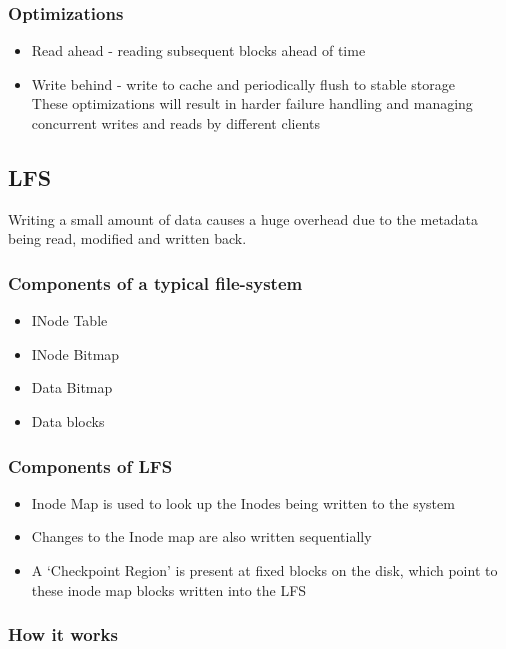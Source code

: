 \documentclass[a4paper]{article}
\begin{document}
\subsubsection{Optimizations}

\begin{itemize}
\item
    Read ahead - reading subsequent blocks ahead of time
\item
    Write behind - write to cache and periodically flush to stable
    storage\\
    These optimizations will result in harder failure handling and
    managing concurrent writes and reads by different clients
\end{itemize}

\subsection{LFS}

Writing a small amount of data causes a huge overhead due to the
metadata being read, modified and written back.

\subsubsection{Components of a typical file-system}

\begin{itemize}
\item
    INode Table
\item
    INode Bitmap
\item
    Data Bitmap
\item
    Data blocks
\end{itemize}

\subsubsection{Components of LFS}

\begin{itemize}
\item
    Inode Map is used to look up the Inodes being written to the system
\item
    Changes to the Inode map are also written sequentially
\item
    A `Checkpoint Region' is present at fixed blocks on the disk, which
    point to these inode map blocks written into the LFS
\end{itemize}

\subsubsection{How it works}
\end{document}
